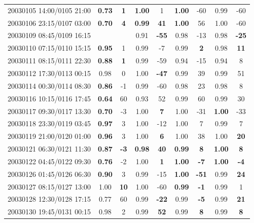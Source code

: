 \documentclass[linenumbers,draft]{agujournal}
\begin{document}
\begin{center}
\begin{longtable}{c||cc|cc|cc|cc}
20030105 14:00/0105 21:00 & \textbf{0.73} & \textbf{1} & \textbf{1.00} & 1 & \textbf{1.00} & -60 & 0.99 & -60 \\
20030106 23:15/0107 03:00 & \textbf{0.70} & \textbf{4} & \textbf{0.99} & \textbf{41} & \textbf{1.00} & 56 & 1.00 & -60 \\
20030109 08:45/0109 16:15 &  &  & 0.91 & \textbf{-55} & 0.98 & -13 & 0.98 & \textbf{-25} \\
20030110 07:15/0110 15:15 & \textbf{0.95} & 1 & 0.99 & -7 & 0.99 & \textbf{2} & 0.98 & \textbf{11} \\
20030111 08:15/0111 22:30 & \textbf{0.88} & \textbf{1} & 0.99 & -59 & 0.94 & -15 & 0.94 & 8 \\
20030112 17:30/0113 00:15 & 0.98 & 0 & 1.00 & \textbf{-47} & 0.99 & 39 & 0.99 & 51 \\
20030114 00:30/0114 08:30 & \textbf{0.86} & -1 & 0.99 & -60 & 0.98 & 23 & 0.98 & 8 \\
20030116 10:15/0116 17:45 & \textbf{0.64} & 60 & 0.93 & 52 & 0.99 & 60 & 0.99 & 30 \\
20030117 09:30/0117 13:30 &\textbf{0.70} & -3 & 1.00 & \textbf{7} & 1.00 & -31 & \textbf{1.00} & -33 \\
20030118 23:30/0119 03:45 & \textbf{0.97} & 3 & 1.00 & -12 & 1.00 & 7 & 0.99 & 7 \\
20030119 21:00/0120 01:00 & \textbf{0.96} & 3 & 1.00 & \textbf{6} & 1.00 & 38 & 1.00 & \textbf{20} \\
20030121 06:30/0121 11:30 & \textbf{0.87} & \textbf{-3} & \textbf{0.98} & \textbf{40} & \textbf{0.99} & \textbf{8} & \textbf{1.00} & \textbf{8} \\
20030122 04:45/0122 09:30 &\textbf{0.76} & -2 & 1.00 & \textbf{1} & \textbf{1.00} & \textbf{-7} & \textbf{1.00} & \textbf{-4} \\
20030126 01:45/0126 06:30 & \textbf{0.90} & 3 & 0.99 & -15 & \textbf{1.00} & \textbf{-51} & 0.99 & \textbf{24} \\
20030127 08:15/0127 13:00 & 1.00 & \textbf{10} & 1.00 & -60 & \textbf{0.99} & \textbf{-1} & 0.99 & 1 \\
20030128 12:30/0128 17:15 & 0.77 & 60 & 0.99 & \textbf{-22} & 0.99 & \textbf{-5} & 0.99 & \textbf{21} \\
20030130 19:45/0131 00:15 & 0.98 & 2 & 0.99 & \textbf{52} & 0.99 & \textbf{8} & 0.99 & \textbf{8} \\
\end{longtable}
\end{center}
\end{document}
